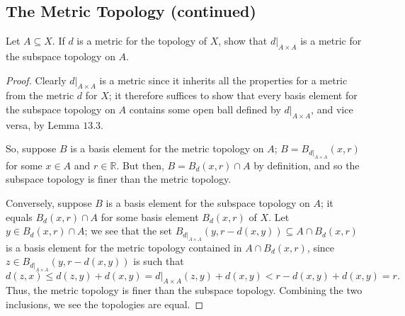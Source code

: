 \documentclass[12pt]{article}
\theoremstyle{remark}
\begin{document}
\subsection{The Metric Topology (continued)}
\begin{problem}
  Let $A \subseteq X$. If $d$ is a metric for the topology of $X$, show that $d|_{A \times A}$ is a metric for the subspace topology on $A$.
\end{problem}
\begin{proof}
  Clearly $d|_{A \times A}$ is a metric since it inherits all the properties for a metric from the metric $d$ for $X$; it therefore suffices to show that every basis element for the subspace topology on $A$ contains some open ball defined by $d|_{A \times A}$, and vice versa, by Lemma $13.3$.
  \par So, suppose $B$ is a basis element for the metric topology on $A$;
  $B = B_{d|_{A \times A}}(x,r)$ for some $x \in A$ and $r \in \mathbb{R}$.
  But then, $B = B_d(x,r) \cap A$ by definition, and so the subspace topology is
  finer than the metric topology.
  \par Conversely, suppose $B$ is a basis element for the subspace topology on
  $A$; it equals $B_d(x,r) \cap A$ for some basis element $B_d(x,r)$ of $X$. Let
  $y \in B_d(x,r) \cap A$; we see that the set $B_{d|_{A \times A}}(y,r-d(x,y))
  \subseteq A \cap B_d(x,r)$ is a basis element for the metric topology
  contained in $A \cap B_d(x,r)$, since $z \in B_{d|_{A \times A}}(y,r-d(x,y))$
  is such that
  \begin{equation*}
    d(z,x) \le d(z,y) + d(x,y) = d|_{A \times A}(z,y) + d(x,y) < r-d(x,y)
    +d(x,y) = r.
  \end{equation*}
  Thus, the metric topology is finer than the subspace topology. Combining the
  two inclusions, we see the topologies are equal.
\end{proof}
\end{document}
